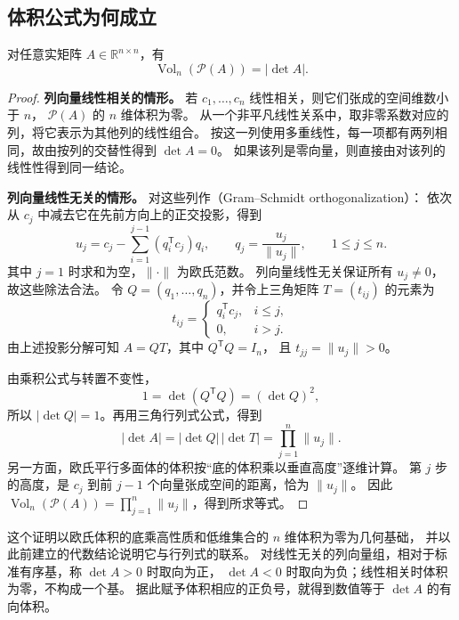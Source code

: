\documentclass[UTF8,12pt,a4paper,fontset=fandol]{ctexart}
\begin{document}
\subsection{体积公式为何成立}

\begin{theorem}[平行多面体的体积]
\label{thm:volume}
对任意实矩阵 $A\in\mathbb R^{n\times n}$，有
\begin{equation}
  \operatorname{Vol}_n(\mathcal P(A))=|\det A|.
  \label{eq:volume}
\end{equation}
\end{theorem}

\begin{proof}
\textbf{列向量线性相关的情形。}
若 $c_1,\ldots,c_n$ 线性相关，则它们张成的空间维数小于 $n$，
$\mathcal P(A)$ 的 $n$ 维体积为零。
从一个非平凡线性关系中，取非零系数对应的列，将它表示为其他列的线性组合。
按这一列使用多重线性，每一项都有两列相同，故由按列的交替性得到 $\det A=0$。
如果该列是零向量，则直接由对该列的线性性得到同一结论。

\textbf{列向量线性无关的情形。}
对这些列作（Gram--Schmidt orthogonalization）：
依次从 $c_j$ 中减去它在先前方向上的正交投影，得到
\[
  u_j=c_j-\sum_{i=1}^{j-1}(q_i^{\mathsf T}c_j)q_i,
  \qquad
  q_j=\frac{u_j}{\|u_j\|},\qquad 1\leq j\leq n.
\]
其中 $j=1$ 时求和为空，$\|\cdot\|$ 为欧氏范数。
列向量线性无关保证所有 $u_j\ne0$，故这些除法合法。
令 $Q=(q_1,\ldots,q_n)$，并令上三角矩阵 $T=(t_{ij})$ 的元素为
\[
  t_{ij}=\begin{cases}
    q_i^{\mathsf T}c_j,&i\leq j,\\
    0,&i>j.
  \end{cases}
\]
由上述投影分解可知 $A=QT$，其中 $Q^{\mathsf T}Q=I_n$，
且 $t_{jj}=\|u_j\|>0$。

由乘积公式与转置不变性，
\[
  1=\det(Q^{\mathsf T}Q)=(\det Q)^2,
\]
所以 $|\det Q|=1$。再用三角行列式公式，得到
\[
  |\det A|=|\det Q|\,|\det T|=\prod_{j=1}^{n}\|u_j\|.
\]
另一方面，欧氏平行多面体的体积按“底的体积乘以垂直高度”逐维计算。
第 $j$ 步的高度，是 $c_j$ 到前 $j-1$ 个向量张成空间的距离，恰为 $\|u_j\|$。
因此 $\operatorname{Vol}_n(\mathcal P(A))=\prod_{j=1}^{n}\|u_j\|$，得到所求等式。
\end{proof}

这个证明以欧氏体积的底乘高性质和低维集合的 $n$ 维体积为零为几何基础，
并以此前建立的代数结论说明它与行列式的联系。
对线性无关的列向量组，相对于标准有序基，称 $\det A>0$ 时取向为正，
$\det A<0$ 时取向为负；线性相关时体积为零，不构成一个基。
据此赋予体积相应的正负号，就得到数值等于 $\det A$ 的有向体积。
\end{document}
